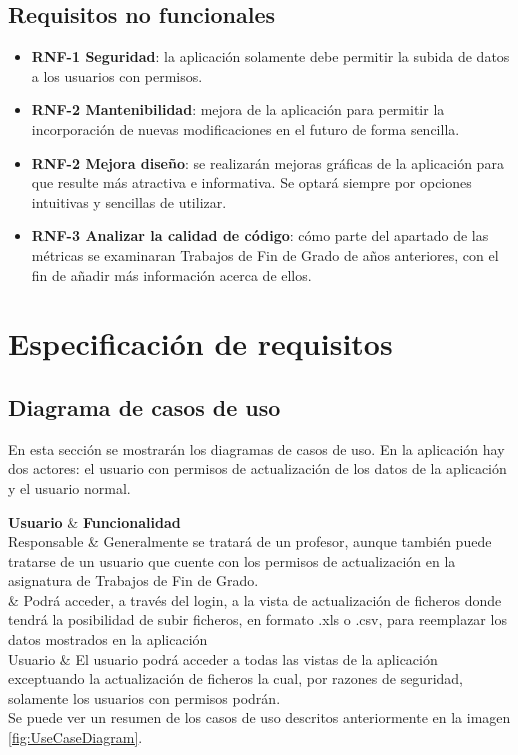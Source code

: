 \subsection{Requisitos no funcionales}
\begin{itemize}
	\item \textbf{RNF-1 Seguridad}: la aplicación solamente debe permitir la subida de datos a los usuarios con permisos.	
	\item \textbf{RNF-2 Mantenibilidad}: mejora de la aplicación para permitir la incorporación de nuevas modificaciones en el futuro de forma sencilla. 	
	\item \textbf{RNF-2 Mejora diseño}: se realizarán mejoras gráficas de la aplicación para que resulte más atractiva e informativa. Se optará siempre por opciones intuitivas y sencillas de utilizar.	
	\item \textbf{RNF-3 Analizar la calidad de código}: cómo parte del apartado de las métricas se examinaran Trabajos de Fin de Grado de años anteriores, con el fin de añadir más información acerca de ellos.

\end{itemize}

\section{Especificación de requisitos}
\subsection{Diagrama de casos de uso}
En esta sección se mostrarán los diagramas de casos de uso. En la aplicación hay dos actores: el usuario con permisos de actualización de los datos de la aplicación y el usuario normal.

{\textbf{Usuario} & \textbf{Funcionalidad} \\}{
	Responsable & Generalmente se tratará de un profesor, aunque también puede tratarse de un usuario que cuente con los permisos de actualización en la asignatura de Trabajos de Fin de Grado. \\\hline
	& Podrá acceder, a través del login, a la vista de actualización de ficheros donde tendrá la posibilidad de subir ficheros, en formato .xls o .csv, para reemplazar los datos mostrados en la aplicación \\
	
	Usuario & El usuario podrá acceder a todas las vistas de la aplicación exceptuando la actualización de ficheros la cual, por razones de seguridad, solamente los usuarios con permisos podrán. \\
}
Se puede ver un resumen de los casos de uso descritos anteriormente en la imagen \ref{fig:UseCaseDiagram}.

